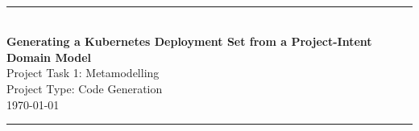 \begin{titlepage}

\newcommand{\HRule}{\rule{\linewidth}{0.5mm}} %
\begin{center}
~\vspace{2cm}  %

\HRule \\[0.6cm] %
\textbf{\LARGE Generating a Kubernetes Deployment Set from a Project-Intent Domain Model} \\[0.3cm]
Project Task 1: Metamodelling \\
Project Type: Code Generation \\
\today\\[0.4cm] %
\HRule \\[1.2cm]
\\[0.4cm]
\\
\\
\end{center}
\newpage
\end{titlepage}

